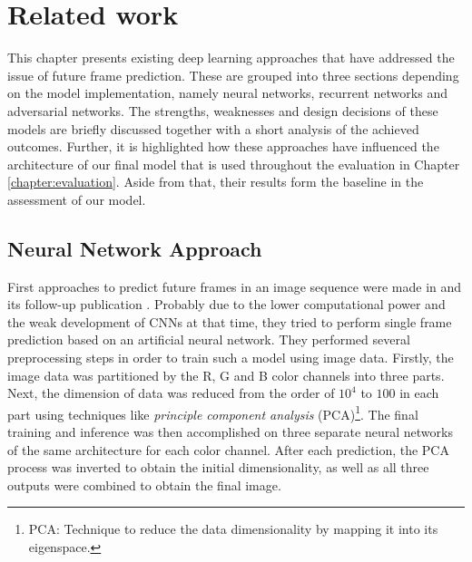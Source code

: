 
\chapter{Related work}  \label{chapter:relatedwork}

This chapter presents existing deep learning approaches that have addressed the issue of future frame prediction. These are grouped into three sections depending on the model implementation, namely neural networks, recurrent networks and adversarial networks. The strengths, weaknesses and design decisions of these models are briefly discussed together with a short analysis of the achieved outcomes. Further, it is highlighted how these approaches have influenced the architecture of our final model that is used throughout the evaluation in Chapter \ref{chapter:evaluation}. Aside from that, their results form the baseline in the assessment of our model.


\section{Neural Network Approach}

First approaches to predict future frames in an image sequence were made in \parencite{ann} and its follow-up publication \parencite{ann2}. Probably due to the lower computational power and the weak development of CNNs at that time, they tried to perform single frame prediction based on an artificial neural network. They performed several preprocessing steps in order to train such a model using image data. Firstly, the image data was partitioned by the R, G and B color channels into three parts. Next, the dimension of data was reduced from the order of $10^4$ to $100$ in each part using techniques like \textit{principle component analysis} (PCA)\footnote{PCA: Technique to reduce the data dimensionality by mapping it into its eigenspace.}. The final training and inference was then accomplished on three separate neural networks of the same architecture for each color channel. After each prediction, the PCA process was inverted to obtain the initial dimensionality, as well as all three outputs were combined to obtain the final image.

